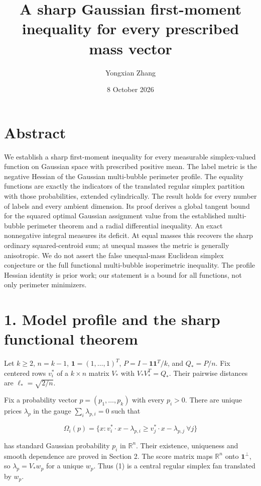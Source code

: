 \documentclass[
  11pt,
]{article}
\title{A sharp Gaussian first-moment inequality for every prescribed
mass vector}
\author{Yongxian Zhang}
\date{8 October 2026}
\begin{document}
\maketitle

\section{Abstract}\label{abstract}

We establish a sharp first-moment inequality for every measurable
simplex-valued function on Gaussian space with prescribed positive mean.
The label metric is the negative Hessian of the Gaussian multi-bubble
perimeter profile. The equality functions are exactly the indicators of
the translated regular simplex partition with those probabilities,
extended cylindrically. The result holds for every number of labels and
every ambient dimension. Its proof derives a global tangent bound for
the squared optimal Gaussian assignment value from the established
multi-bubble perimeter theorem and a radial differential inequality. An
exact nonnegative integral measures its deficit. At equal masses this
recovers the sharp ordinary squared-centroid sum; at unequal masses the
metric is generally anisotropic. We do not assert the false unequal-mass
Euclidean simplex conjecture or the full functional multi-bubble
isoperimetric inequality. The profile Hessian identity is prior work;
our statement is a bound for all functions, not only perimeter
minimizers.

\section{1. Model profile and the sharp functional
theorem}\label{model-profile-and-the-sharp-functional-theorem}

Let \(k\ge2\), \(n=k-1\), \(\mathbf1=(1,\ldots,1)^T\),
\(P=I-\mathbf1\mathbf1^T/k\), and \(Q_*=P/n\). Fix centered rows
\(v_i^*\) of a \(k\times n\) matrix \(V_*\) with \(V_*V_*^T=Q_*\). Their
pairwise distances are \(\ell_* =\sqrt{2/n}\).

Fix a probability vector \(p=(p_1,\ldots,p_k)\) with every \(p_i>0\).
There are unique prices \(\lambda_p\) in the gauge
\(\sum_i\lambda_{p,i}=0\) such that

\[
 \Omega_i(p)=\{x:v_i^*\cdot x-\lambda_{p,i}
                   \ge v_j^*\cdot x-\lambda_{p,j}\ \forall j\}
                                                               \tag{1}
\]

has standard Gaussian probability \(p_i\) in \(\mathbb R^n\). Their
existence, uniqueness and smooth dependence are proved in Section 2. The
score matrix maps \(\mathbb R^n\) onto \(\mathbf1^\perp\), so
\(\lambda_p=V_*w_p\) for a unique \(w_p\). Thus (1) is a central regular
simplex fan translated by \(w_p\).
\end{document}
